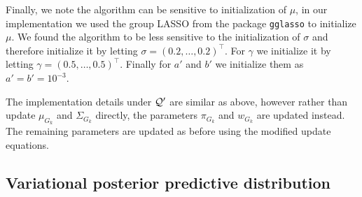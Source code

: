Finally, we note the algorithm can be sensitive to initialization of $\mu$, in our implementation we used the group LASSO from the package \texttt{gglasso} to initialize $\mu$. We found the algorithm to be less sensitive to the initialization of $\sigma$ and therefore initialize it by letting $\sigma = (0.2,\dots, 0.2)^\top$. For $\gamma$ we initialize it by letting $\gamma = (0.5, \dots, 0.5)^\top$. Finally for $a'$ and $b'$ we initialize them as $a' = b' = 10^{-3}$.

The implementation details under $\mathcal{Q}'$ are similar as above, however rather than update $\mu_{G_k}$ and $\Sigma_{G_k}$ directly, the parameters $\pi_{G_k}$ and $w_{G_k}$ are updated instead. The remaining parameters are updated as before using the modified update equations.


\subsection{Variational posterior predictive distribution}

